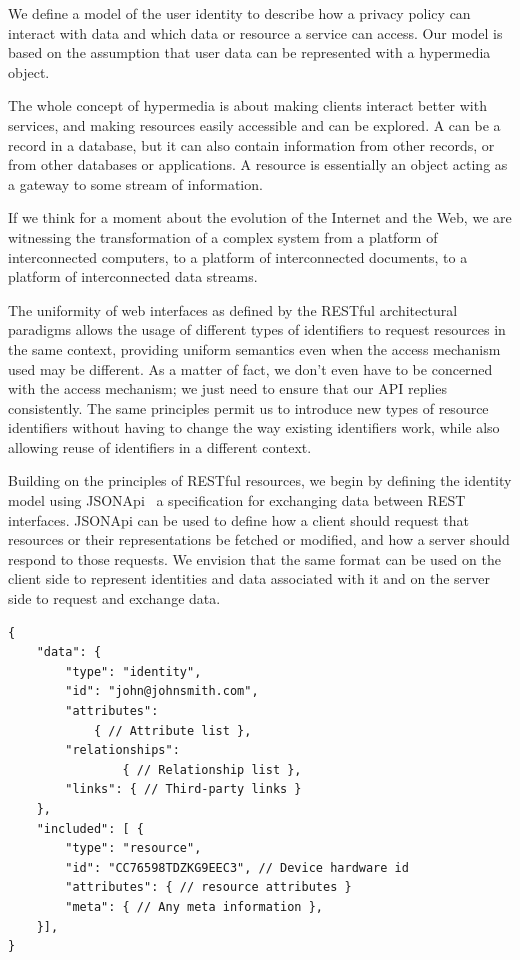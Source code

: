 We define a model of the user identity to describe how a privacy policy can interact with data and which data or resource a service can access. Our model is based on the assumption that user data can be represented with a hypermedia object. 

The whole concept of hypermedia is about making clients interact better with services, and making resources easily accessible and can be explored. A can be a record in a database, but it can also contain information from other records, or from other databases or applications. A resource is essentially an object acting as a gateway to some stream of information.

If we think for a moment about the evolution of the Internet and the Web, we are witnessing the transformation of a complex system from a platform of interconnected computers, to a platform of interconnected documents, to a platform of interconnected data streams. 

The uniformity of web interfaces as defined by the RESTful architectural paradigms allows the usage of different types of identifiers to request resources in the same context, providing uniform semantics even when the access mechanism used may be different. As a matter of fact, we don't even have to be concerned with the access mechanism; we just need to ensure that our API replies consistently. The same principles permit us to introduce new types of resource identifiers without having to change the way existing identifiers work, while also allowing reuse of identifiers in a different context.

Building on the principles of RESTful resources, we begin by defining the identity model using JSONApi~\cite{Jsonapi} a specification for exchanging data between REST interfaces. JSONApi can be used to define how a client should request that resources or their representations be fetched or modified, and how a server should respond to those requests. We envision that the same format can be used on the client side to represent identities and data associated with it and on the server side to request and exchange data.

\begin{lstlisting}
{
    "data": {
        "type": "identity",
        "id": "john@johnsmith.com",
        "attributes":
            { // Attribute list },
        "relationships":
                { // Relationship list },
        "links": { // Third-party links }
    },
    "included": [ {
        "type": "resource",
        "id": "CC76598TDZKG9EEC3", // Device hardware id
        "attributes": { // resource attributes }
        "meta": { // Any meta information },
    }],
}
\end{lstlisting}

